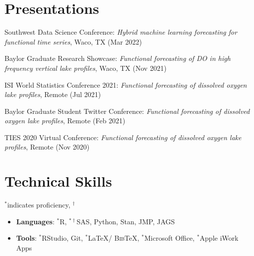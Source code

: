 \documentclass{article}
\begin{document}
%
\section{Presentations}
\begin{etaremune}
	\item Southwest Data Science Conference: \textit{Hybrid machine learning forecasting for functional time series}, Waco, TX (Mar 2022) \vspace{-4px}
	\item Baylor Graduate Research Showcase: \textit{Functional forecasting of DO in high frequency vertical lake profiles}, Waco, TX (Nov 2021) \vspace{-4px}
	\item ISI World Statistics Conference 2021: \textit{Functional forecasting of dissolved oxygen lake profiles}, Remote (Jul 2021) \vspace{-4px}
	\item Baylor Graduate Student Twitter Conference: \textit{Functional forecasting of dissolved oxygen lake profiles}, Remote (Feb 2021)\vspace{-4px} 
	\item TIES 2020 Virtual Conference: \textit{Functional forecasting of dissolved oxygen lake profiles}, Remote (Nov 2020)  \vspace{-4px}
\end{etaremune}

%
\section{Technical Skills}
$^{*}$indicates proficiency, $^\dagger$  
\begin{itemize}[leftmargin=*]
	\item \textbf{Languages}: $^{*}$R, $^{* \dagger}$SAS, Python, Stan, JMP, JAGS \vspace{-4px}
	\item \textbf{Tools}: $^{*}$RStudio, Git, $^{*}$\LaTeX / \textsc{Bib}\TeX, $^{*}$Microsoft Office, $^{*}$Apple iWork Apps  \vspace{-4px}
\end{itemize}
\end{document}
